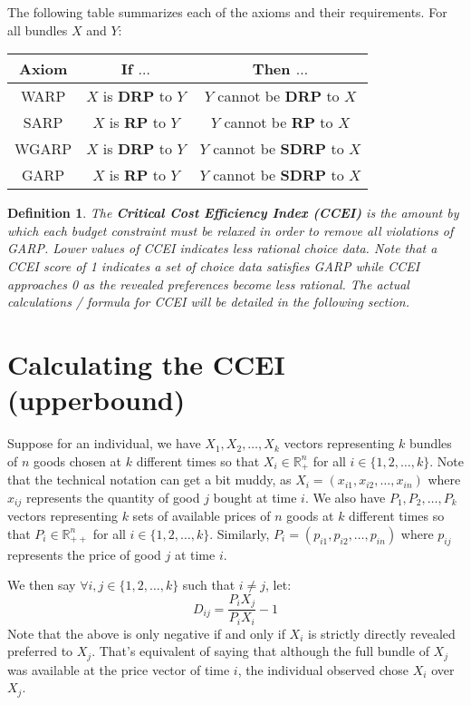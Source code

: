 \documentclass{article} %
\newtheorem{definition}{Definition} %
\begin{document}
The following table summarizes each of the axioms and their requirements. For all bundles $X$ and $Y$:

\renewcommand{\arraystretch}{1.5}
\begin{center}
\begin{tabular}{ c|c|c } 
Axiom & If $\ldots$ & Then $\ldots$ \\\hline
WARP&$X$ is \textbf{DRP} to $Y$&$Y$ cannot be \textbf{DRP} to $X$ \\
SARP&$X$ is \textbf{RP} to $Y$&$Y$ cannot be \textbf{RP} to $X$ \\
WGARP&$X$ is \textbf{DRP} to $Y$&$Y$ cannot be \textbf{SDRP} to $X$ \\
GARP&$X$ is \textbf{RP} to $Y$&$Y$ cannot be \textbf{SDRP} to $X$
\end{tabular}
\end{center}
\renewcommand{\arraystretch}{1}

\begin{definition}
The \textbf{Critical Cost Efficiency Index (CCEI)} is the amount by which each budget
constraint must be relaxed in order to remove all violations of GARP. Lower values of CCEI indicates less rational choice data. Note that a CCEI score of 1 indicates a set of choice data satisfies GARP while CCEI approaches 0 as the revealed preferences become less rational. The actual calculations / formula for CCEI will be detailed in the following section.
\end{definition}

\section{Calculating the CCEI (upperbound)}
Suppose for an individual, we have $X_{1}, X_{2}, \ldots, X_{k}$ vectors representing $k$ bundles of $n$ goods chosen at $k$ different times so that $X_{i}\in\mathbb{R}^{n}_{+}$ for all $i\in\{1,2,\ldots,k\}$. Note that the technical notation can get a bit muddy, as $X_{i}=(x_{i1}, x_{i2}, \ldots, x_{in})$ where $x_{ij}$ represents the quantity of good $j$ bought at time $i$. We also have $P_{1}, P_{2}, \dots, P_{k}$ vectors representing $k$ sets of available prices of $n$ goods at $k$ different times so that $P_{i}\in\mathbb{R}^{n}_{++}$ for all $i\in\{1,2,\ldots,k\}$. Similarly, $P_{i}=(p_{i1}, p_{i2}, \ldots, p_{in})$ where $p_{ij}$ represents the price of good $j$ at time $i$.

We then say $\forall i,j\in\{1,2,\ldots,k\}$ such that $i\not=j$, let:
    $$D_{ij}=\frac{P_{i}X_{j}}{P_{i}X_{i}}-1$$
Note that the above is only negative if and only if $X_{i}$ is strictly directly revealed preferred to $X_{j}$. That's equivalent of saying that although the full bundle of $X_{j}$ was available at the price vector of time $i$, the individual observed chose $X_{i}$ over $X_{j}$.
\end{document}

